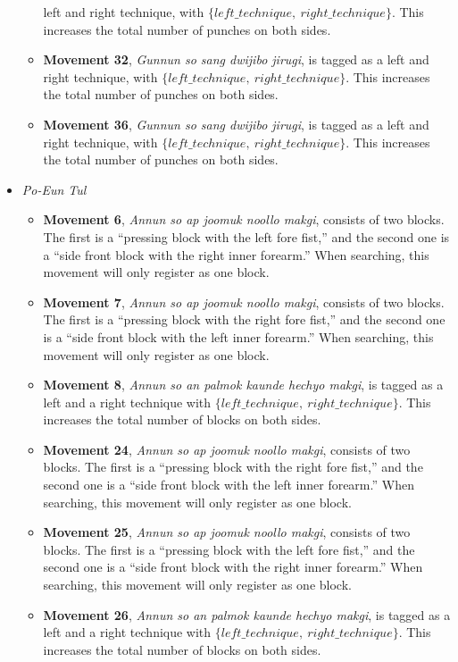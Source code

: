 \documentclass[10pt,twocolumn,a4paper]{article}
\begin{document}
\begin{itemize}
\begin{itemize}
        left and right technique, with $\{left\_technique, \:
        right\_technique\}$. This increases the total number of punches on
        both sides.
      \item
        {\bf Movement 32}, \emph{Gunnun so sang dwijibo jirugi}, is tagged as
        a left and right technique, with $\{left\_technique, \:
        right\_technique\}$. This increases the total number of punches on
        both sides.
      \item
        {\bf Movement 36}, \emph{Gunnun so sang dwijibo jirugi}, is tagged as
        a left and right technique, with $\{left\_technique, \:
        right\_technique\}$. This increases the total number of punches on
        both sides.
    \end{itemize}
  \item
    \emph{Po-Eun Tul}
    \begin{itemize}
      \item
        {\bf Movement 6}, \emph{Annun so ap joomuk noollo makgi}, consists of
        two blocks. The first is a ``pressing block with the left fore fist,''
        and the second one is a ``side front block with the right inner
        forearm.'' When searching, this movement will only register as one
        block.
      \item
        {\bf Movement 7}, \emph{Annun so ap joomuk noollo makgi}, consists of
        two blocks. The first is a ``pressing block with the right fore
        fist,'' and the second one is a ``side front block with the left inner
        forearm.'' When searching, this movement will only register as one
        block.
      \item
        {\bf Movement 8}, \emph{Annun so an palmok kaunde hechyo makgi}, is
        tagged as a left and a right technique with $\{left\_technique, \:
        right\_technique\}$. This increases the total number of blocks on both
        sides.
      \item
        {\bf Movement 24}, \emph{Annun so ap joomuk noollo makgi}, consists of
        two blocks. The first is a ``pressing block with the right fore
        fist,'' and the second one is a ``side front block with the left inner
        forearm.'' When searching, this movement will only register as one
        block.
      \item
        {\bf Movement 25}, \emph{Annun so ap joomuk noollo makgi}, consists of
        two blocks. The first is a ``pressing block with the left fore fist,''
        and the second one is a ``side front block with the right inner
        forearm.'' When searching, this movement will only register as one
        block.
      \item
        {\bf Movement 26}, \emph{Annun so an palmok kaunde hechyo makgi}, is
        tagged as a left and a right technique with $\{left\_technique, \:
        right\_technique\}$. This increases the total number of blocks on both
        sides.
    \end{itemize}


\end{itemize}
\end{document}
